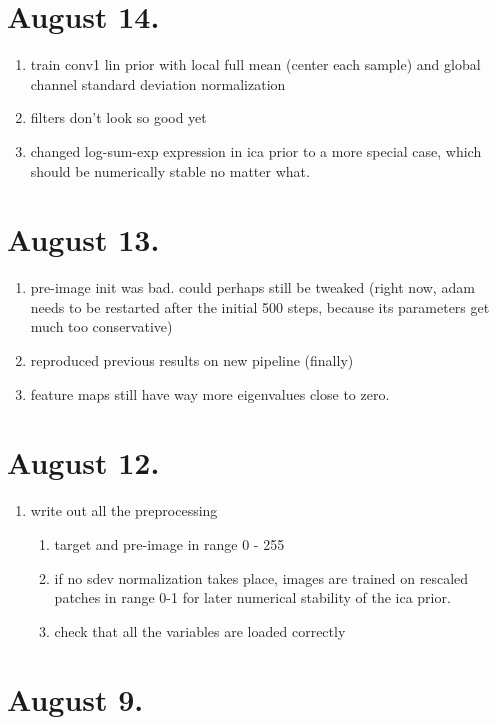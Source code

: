 \documentclass{article}
\begin{document}
\section{August 14.}

\begin{enumerate}
	\item train conv1 lin prior with local full mean (center each sample) and global channel standard deviation normalization 
	\item filters don't look so good yet
	\item changed log-sum-exp expression in ica prior to a more special case, which should be numerically stable no matter what.
\end{enumerate}


\section{August 13.}

\begin{enumerate}
	\item pre-image init was bad. could perhaps still be tweaked (right now, adam needs to be restarted after the initial 500 steps, because its parameters get much too conservative)
	\item reproduced previous results on new pipeline (finally)
	\item feature maps still have way more eigenvalues close to zero.
\end{enumerate}


\section{August 12.}

\begin{enumerate}
	\item write out all the preprocessing
	\begin{enumerate}
		\item target and pre-image in range 0 - 255
		\item if no sdev normalization takes place, images are trained on rescaled patches in range 0-1 for later numerical stability of the ica prior.
		\item check that all the variables are loaded correctly
	\end{enumerate}
\end{enumerate}


\section{August 9.}
\end{document}
